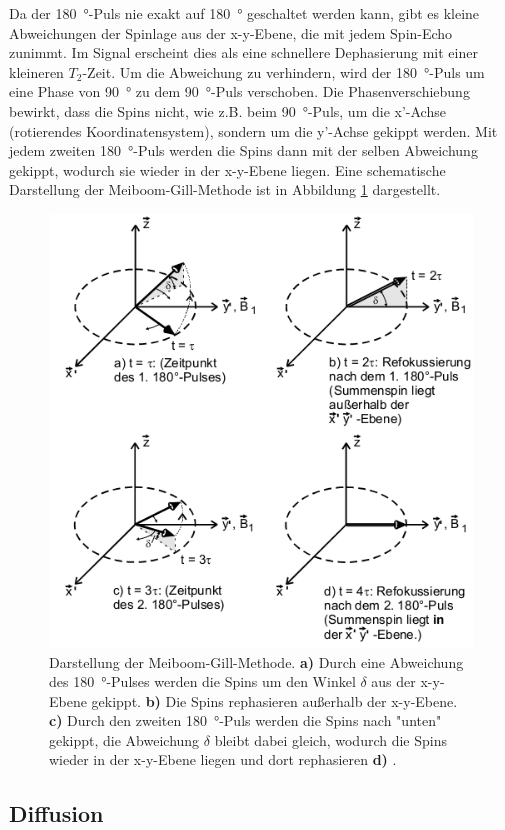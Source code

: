 Da der \SI{180}{\degree}-Puls nie exakt auf \SI{180}{\degree} geschaltet werden kann, gibt es kleine Abweichungen der Spinlage aus der x-y-Ebene, die mit jedem Spin-Echo zunimmt.
Im Signal erscheint dies als eine schnellere Dephasierung mit einer kleineren $T_2$-Zeit.
Um die Abweichung zu verhindern, wird der \SI{180}{\degree}-Puls um eine Phase von \SI{90}{\degree} zu dem \SI{90}{\degree}-Puls verschoben.
Die Phasenverschiebung bewirkt, dass die Spins nicht, wie z.B. beim \SI{90}{\degree}-Puls, um die x'-Achse (rotierendes Koordinatensystem), sondern um die y'-Achse gekippt werden.
Mit jedem zweiten \SI{180}{\degree}-Puls werden die Spins dann mit der selben Abweichung gekippt, wodurch sie wieder in der x-y-Ebene liegen.
Eine schematische Darstellung der Meiboom-Gill-Methode ist in Abbildung \ref{fig:Meiboom-Gill} dargestellt.

\begin{figure}[H]
  \centering
  \includegraphics[width = .4\textwidth]{Meiboom-Gill.png}
  \caption{Darstellung der Meiboom-Gill-Methode. \textbf{a)} Durch eine Abweichung des \SI{180}{\degree}-Pulses werden die Spins um den Winkel $\delta$ aus der x-y-Ebene gekippt. \textbf{b)} Die Spins rephasieren außerhalb der x-y-Ebene. \textbf{c)} Durch den zweiten \SI{180}{\degree}-Puls werden die Spins nach "unten" gekippt, die Abweichung $\delta$ bleibt dabei gleich, wodurch die Spins wieder in der x-y-Ebene liegen und dort rephasieren \textbf{d)} \cite{Finke}.}
  \label{fig:Meiboom-Gill}
\end{figure}


\subsection{Diffusion}


